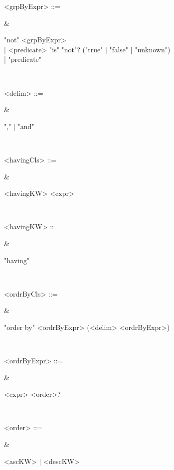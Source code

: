 {%

    \noindent\parbox[t]{0.3\linewidth}{<grpByExpr> ::=} 
    & \noindent\parbox[t]{0.6\linewidth}{
        "not" <grpByExpr> \\
        | <predicate> "is" "not"? ("true" | "false" | "unknown") \\
        | "predicate"
    } \\


    \noindent\parbox[t]{0.3\linewidth}{<delim> ::=} 
    & \noindent\parbox[t]{0.6\linewidth}{
        "," | "and"
    } \\


    \noindent\parbox[t]{0.3\linewidth}{<havingCls> ::=} 
    & \noindent\parbox[t]{0.6\linewidth}{
        <havingKW> <expr>
    } \\


    \noindent\parbox[t]{0.3\linewidth}{<havingKW> ::=} 
    & \noindent\parbox[t]{0.6\linewidth}{
        "having"
    } \\


    \noindent\parbox[t]{0.3\linewidth}{<ordrByCls> ::=} 
    & \noindent\parbox[t]{0.6\linewidth}{
        "order by" <ordrByExpr> (<delim> <ordrByExpr>)
    } \\


    \noindent\parbox[t]{0.3\linewidth}{<ordrByExpr> ::=} 
    & \noindent\parbox[t]{0.6\linewidth}{
        <expr> <order>?
    } \\


    \noindent\parbox[t]{0.3\linewidth}{<order> ::=} 
    & \noindent\parbox[t]{0.6\linewidth}{
        <ascKW> | <descKW>
    } \\


}
